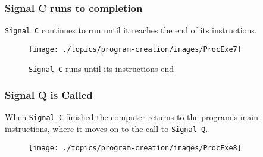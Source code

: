
\clearpage
\subsubsection{Signal C runs to completion} %
\label{ssub:signal_c_runs_to_completion}

\texttt{Signal C} continues to run until it reaches the end of its instructions.

\begin{figure}[htbp]
   \centering
   \texttt{[image: ./topics/program-creation/images/ProcExe7]} 
   \caption{\texttt{Signal C} runs until its instructions end}
   \label{fig:procedure-decl-visualise-morsecalling-7}
\end{figure}



\clearpage
\subsubsection{Signal Q is Called} %
\label{ssub:signal_q_is_called}

When \texttt{Signal C} finished the computer returns to the program's main instructions, where it moves on to the call to \texttt{Signal Q}.

\begin{figure}[htbp]
   \centering
   \texttt{[image: ./topics/program-creation/images/ProcExe8]} 
   \caption{}
   \label{fig:procedure-decl-visualise-morsecalling-8}
\end{figure}

